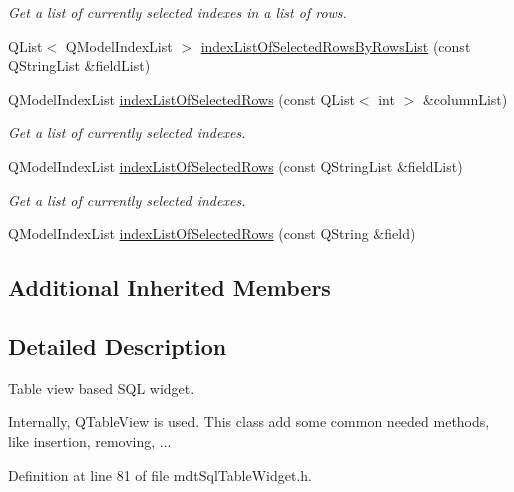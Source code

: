 \begin{DoxyCompactItemize}
\begin{DoxyCompactList}\small\item\em Get a list of currently selected indexes in a list of rows. \end{DoxyCompactList}\item 
Q\-List$<$ Q\-Model\-Index\-List $>$ \hyperlink{classmdt_sql_table_widget_a5abe02dacc9fd8c0c33c27dbc5216d1b}{index\-List\-Of\-Selected\-Rows\-By\-Rows\-List} (const Q\-String\-List \&field\-List)
\item 
Q\-Model\-Index\-List \hyperlink{classmdt_sql_table_widget_a9a43d9a5d2e63189f17d2bce7159e510}{index\-List\-Of\-Selected\-Rows} (const Q\-List$<$ int $>$ \&column\-List)
\begin{DoxyCompactList}\small\item\em Get a list of currently selected indexes. \end{DoxyCompactList}\item 
Q\-Model\-Index\-List \hyperlink{classmdt_sql_table_widget_abe241fe0b24552b5403cb15593e18cdd}{index\-List\-Of\-Selected\-Rows} (const Q\-String\-List \&field\-List)
\begin{DoxyCompactList}\small\item\em Get a list of currently selected indexes. \end{DoxyCompactList}\item 
Q\-Model\-Index\-List \hyperlink{classmdt_sql_table_widget_a9616d390c25a3b1e863e855e00172e42}{index\-List\-Of\-Selected\-Rows} (const Q\-String \&field)
\end{DoxyCompactItemize}
\subsection*{Additional Inherited Members}


\subsection{Detailed Description}
Table view based S\-Q\-L widget. 

Internally, Q\-Table\-View is used. This class add some common needed methods, like insertion, removing, ... 

Definition at line 81 of file mdt\-Sql\-Table\-Widget.\-h.



